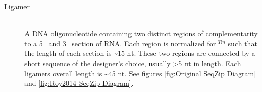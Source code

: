 \begin{description}
  \item[Ligamer] \hfill \\
  A DNA oligonucleotide containing two distinct regions of complementarity to a 5\textprime~ and 3\textprime~ section of RNA. Each region is normalized for $^{Tm}$ such that the length of each section is \textasciitilde15 nt. These two regions are connected by a short sequence of the designer's choice, usually >5 nt in length. Each ligamers overall length is \textasciitilde45 nt. See figures \ref{fig:Original SeqZip Diagram} and \ref{fig:Roy2014 SeqZip Diagram}.

  \end{description}
  \clearpage %